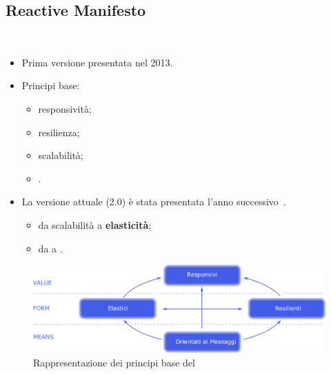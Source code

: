         \subsection{Reactive Manifesto}\label{subsec:manifest}
        \begin{frame}{\insertsectionhead}
            \begin{block}{\insertsubsectionhead~\cite{citeulike:13845446}}
                \begin{itemize}
                    \item
                        Prima versione presentata nel 2013.
                    \item
                        Principi base:
                        \begin{itemize}
                            \item responsività;
                            \item resilienza;
                            \item scalabilità;
                            \item {}.
                        \end{itemize}
                    \item
                        La versione attuale (2.0) è stata presentata l'anno successivo~\footnotemark.
                        \begin{itemize}
                            \item da scalabilità a \textbf{elasticità};
                            \item da  a \textbf{}.
                        \end{itemize}
                \end{itemize}
            \end{block}
        \end{frame}

        \begin{frame}[c]{\insertsectionhead}{\insertsubsectionhead}
            \begin{figure}[htbp]
                \centering
                \includegraphics[width=\linewidth]{reactive-traits-it}
                \caption{Rappresentazione dei principi base del }
                \label{fig:manifest}
            \end{figure}
        \end{frame}

